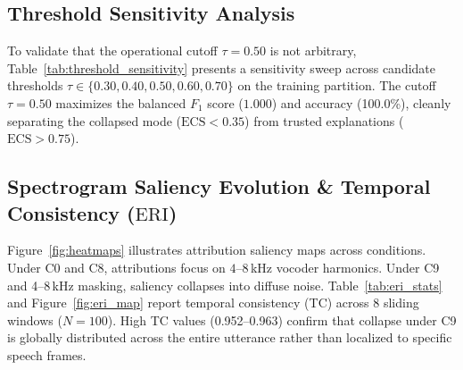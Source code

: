 \documentclass[runningheads]{llncs}
\newcommand{\ecs}{\ensuremath{\mathrm{ECS}}}
\newcommand{\eri}{\ensuremath{\mathrm{ERI}}}
\begin{document}
\subsection{Threshold Sensitivity Analysis}
To validate that the operational cutoff $\tau = 0.50$ is not arbitrary, Table~\ref{tab:threshold_sensitivity} presents a sensitivity sweep across candidate thresholds $\tau \in \{0.30, 0.40, 0.50, 0.60, 0.70\}$ on the training partition.
The cutoff $\tau = 0.50$ maximizes the balanced $F_1$ score ($1.000$) and accuracy (100.0\%), cleanly separating the collapsed mode ($\ecs < 0.35$) from trusted explanations ($\ecs > 0.75$).

\begin{table}[tb]
\centering
\caption{Sensitivity analysis across candidate \ecs{} trust thresholds $\tau$.}
\label{tab:threshold_sensitivity}
\end{table}

\subsection{Spectrogram Saliency Evolution \& Temporal Consistency (\texorpdfstring{\eri{}}{ERI})}
Figure~\ref{fig:heatmaps} illustrates attribution saliency maps across conditions.
Under C0 and C8, attributions focus on $4$--$8$\,kHz vocoder harmonics.
Under C9 and 4--8\,kHz masking, saliency collapses into diffuse noise.
Table~\ref{tab:eri_stats} and Figure~\ref{fig:eri_map} report temporal consistency (TC) across 8 sliding windows ($N=100$).
High TC values (0.952--0.963) confirm that collapse under C9 is globally distributed across the entire utterance rather than localized to specific speech frames.
\end{document}
